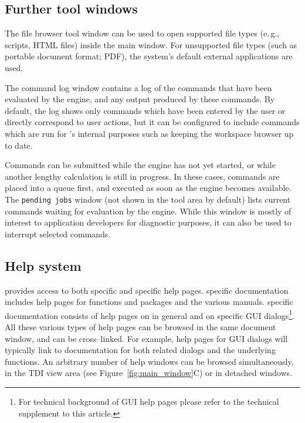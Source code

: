 \subsection{Further tool windows}
\label{sec:further_tool_windows}

The file browser tool window can be
used to open supported file types (e.\,g., 
scripts, HTML files) inside the main 
window. For unsupported file types (such as portable document format; PDF), the
system's default external applications are used.

The command log window contains a log of the commands that have been
evaluated by the  engine, and any output
produced by these commands. By default, the log shows only commands
which have been entered by the user or directly correspond to user
actions, but it can be configured to include commands which are run for
's internal purposes such as keeping the workspace browser up
to date.

Commands can be submitted while the  engine
has not yet started, or while another lengthy calculation is still
in progress. In these cases, commands are placed into a queue first, and
executed as soon as the  engine becomes
available. The \texttt{pending jobs} window (not shown in the tool area by default)
lists current  commands waiting for
evaluation by the  engine. While this
window is mostly of interest to application developers for diagnostic
purposes, it can also be used to interrupt selected commands.

\subsection{Help system}
\label{sec:help_system}

 provides access to both  specific and 
 specific help pages.
 specific documentation includes help pages for functions and packages 
and the various  manuals.  specific documentation consists of
help pages on  in general and on specific GUI dialogs\footnote{For technical 
background of  GUI help pages please refer to the technical supplement to this article.}. 
All these various types of help pages can be browsed in the same document 
window, and can be cross--linked. For example, help pages for
 GUI dialogs will typically link to documentation for both
related  dialogs and the underlying  functions.
An arbitrary number of help windows can be browsed simultaneously, in the
TDI view area (see Figure~\ref{fig:main_window}C) or in detached windows.

